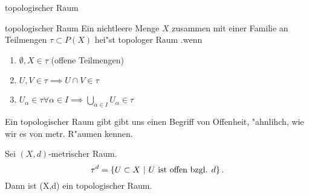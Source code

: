 \documentclass[class=article, crop=false]{standalone}
\begin{document}
\begin{zettel}{topologischer Raum}
\begin{flashcard}[plfuoiem]{topologischer Raum}
	Ein nichtleere Menge $X$ zusammen mit einer Familie an Teilmengen $\tau \subset P(X)$  hei"st topologer Raum .wenn
	\begin{enumerate}
		\item $\emptyset, X \in  \tau $ (offene Teilmengen)
		\item $U,V \in  \tau  \implies U \cap V \in  \tau $
		\item $U_\alpha \in \tau \forall  \alpha \in I \implies \bigcup_{\alpha \in  I} U_{\alpha} \in  \tau  $
	\end{enumerate}
\end{flashcard}
\begin{remark}
	Ein topologischer Raum gibt gibt uns einen Begriff von Offenheit, "ahnlihch, wie wir es von metr. R"aumen kennen.
\end{remark}

\begin{example}
	Sei $ (X,d) $-metrischer Raum.
	\[
		\tau^d = \set{U \subset X}{U \text{ ist offen bzgl. } d }
	.\]
	Dann ist (X,d) ein topologischer Raum.
\end{example}

\end{zettel}
\end{document}
